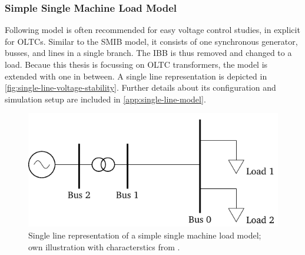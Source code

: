 \subsubsection{Simple Single Machine Load Model}

Following model is often recommended \quelle for easy voltage control studies, in explicit for \acsp{OLTC}. 
Similar to the \ac{SMIB} model, it consists of one synchronous generator, busses, and lines in a single branch. 
The \ac{IBB} is thus removed and changed to a load. 
Becaue this thesis is focussing on \acs{OLTC} transformers, the model is extended with one in between. 
A single line representation is depicted in \autoref{fig:single-line-voltage-stability}.
Further details about its configuration and simulation setup are included in \autoref{app:single-line-model}. 

\begin{figure}[htb!]
    \centering
    \vspace{12pt}
    \includegraphics{tikz_graphics/images/sm_load_model.pdf}
    \vspace{12pt}
    \caption[Single line representation of a simple single machine load model]{Single line representation of a simple single machine load model; own illustration with characterstics from \autocite{kundur_2022}.}
    \label{fig:single-line-voltage-stability}
\end{figure}


